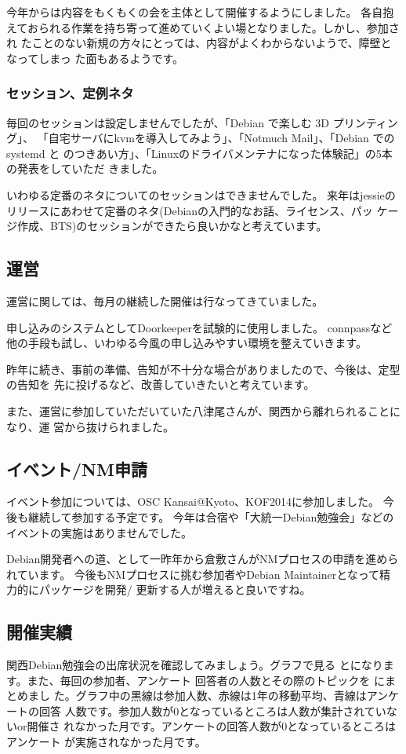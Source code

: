 \documentclass[mingoth,a4paper]{jsarticle}
\begin{document}
今年からは内容をもくもくの会を主体として開催するようにしました。
各自抱えておられる作業を持ち寄って進めていくよい場となりました。しかし、参加され
たことのない新規の方々にとっては、内容がよくわからないようで、障壁となってしまっ
た面もあるようです。

\subsubsection{セッション、定例ネタ}

毎回のセッションは設定しませんでしたが、「Debian で楽しむ 3D プリンティング」、
「自宅サーバにkvmを導入してみよう」、「Notmuch Mail」、「Debian での systemd と
  のつきあい方」、「Linuxのドライバメンテナになった体験記」の5本の発表をしていただ
きました。

いわゆる定番のネタについてのセッションはできませんでした。
来年はjessieのリリースにあわせて定番のネタ(Debianの入門的なお話、ライセンス、パッ
ケージ作成、BTS)のセッションができたら良いかなと考えています。

\subsection{運営}

運営に関しては、毎月の継続した開催は行なってきていました。

申し込みのシステムとしてDoorkeeperを試験的に使用しました。
connpassなど他の手段も試し、いわゆる今風の申し込みやすい環境を整えていきます。

昨年に続き、事前の準備、告知が不十分な場合がありましたので、今後は、定型の告知を
先に投げるなど、改善していきたいと考えています。

また、運営に参加していただいていた八津尾さんが、関西から離れられることになり、運
営から抜けられました。

\subsection{イベント/NM申請}

イベント参加については、OSC Kansai@Kyoto、KOF2014に参加しました。
今後も継続して参加する予定です。
%
今年は合宿や「大統一Debian勉強会」などのイベントの実施はありませんでした。

Debian開発者への道、として一昨年から倉敷さんがNMプロセスの申請を進められています。
今後もNMプロセスに挑む参加者やDebian Maintainerとなって精力的にパッケージを開発/
更新する人が増えると良いですね。

\subsection{開催実績}
関西Debian勉強会の出席状況を確認してみましょう。グラフで見る
とになります。また、毎回の参加者、アンケート
回答者の人数とその際のトピックを  にまとめまし
た。グラフ中の黒線は参加人数、赤線は1年の移動平均、青線はアンケートの回答
人数です。参加人数が$0$となっているところは人数が集計されていないor開催さ
れなかった月です。アンケートの回答人数が$0$となっているところはアンケート
が実施されなかった月です。
\end{document}
